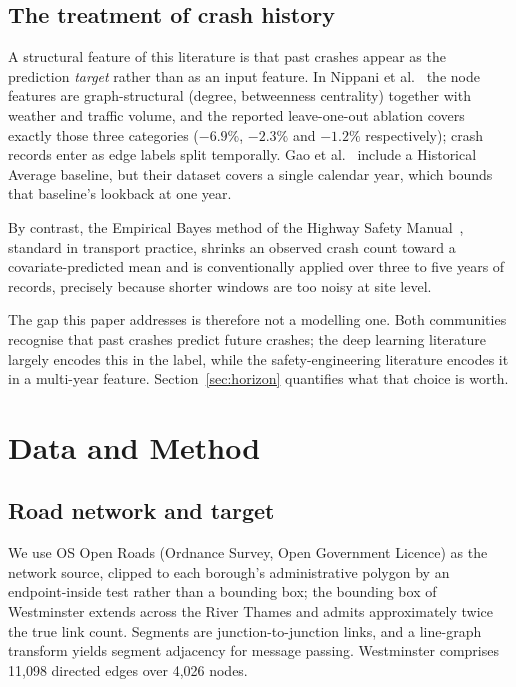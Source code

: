 \documentclass[conference]{IEEEtran}
\begin{document}
\subsection{The treatment of crash history}

A structural feature of this literature is that past crashes appear as the
prediction \emph{target} rather than as an input feature. In
Nippani et al.~\cite{nippani2023} the node features are graph-structural
(degree, betweenness centrality) together with weather and traffic volume,
and the reported leave-one-out ablation covers exactly those three
categories ($-6.9\%$, $-2.3\%$ and $-1.2\%$ respectively); crash records
enter as edge labels split temporally. Gao et al.~\cite{gao2024} include a
Historical Average baseline, but their dataset covers a single calendar
year, which bounds that baseline's lookback at one year.

By contrast, the Empirical Bayes method of the Highway Safety
Manual~\cite{hsm2010}, standard in transport practice, shrinks an observed
crash count toward a covariate-predicted mean and is conventionally
applied over three to five years of records, precisely because shorter
windows are too noisy at site level.

The gap this paper addresses is therefore not a modelling one. Both
communities recognise that past crashes predict future crashes; the deep
learning literature largely encodes this in the label, while the
safety-engineering literature encodes it in a multi-year feature.
Section~\ref{sec:horizon} quantifies what that choice is worth.

\section{Data and Method}

\subsection{Road network and target}

We use OS Open Roads (Ordnance Survey, Open Government Licence) as the
network source, clipped to each borough's administrative polygon by an
endpoint-inside test rather than a bounding box; the bounding box of
Westminster extends across the River Thames and admits approximately twice
the true link count. Segments are junction-to-junction links, and a
line-graph transform yields segment adjacency for message passing.
Westminster comprises 11,098 directed edges over 4,026 nodes.
\end{document}
